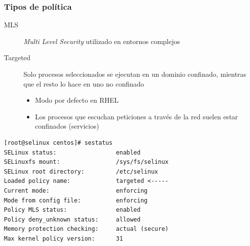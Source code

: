 \documentclass[aspectratio=169]{beamer}
\begin{document}
\begin{frame}[fragile]
  \frametitle{Tipos de política}
  \begin{description}
  \item[MLS] \textit{Multi Level Security} utilizado en entornos complejos 
  \item[Targeted] Solo procesos seleccionados se ejecutan en un
    dominio confinado, mientras que el resto lo hace en uno no confinado
    \begin{itemize}
    \item Modo por defecto en RHEL
    \item Los procesos que escuchan peticiones a través de la red
      suelen estar confinados (servicios)
    \end{itemize}
  \end{description}
  \begin{lstlisting}[basicstyle=\scriptsize\ttfamily]
[root@selinux centos]# sestatus 
SELinux status:                 enabled
SELinuxfs mount:                /sys/fs/selinux
SELinux root directory:         /etc/selinux
Loaded policy name:             targeted <-----
Current mode:                   enforcing
Mode from config file:          enforcing
Policy MLS status:              enabled
Policy deny_unknown status:     allowed
Memory protection checking:     actual (secure)
Max kernel policy version:      31
  \end{lstlisting}
\end{frame}
\end{document}

